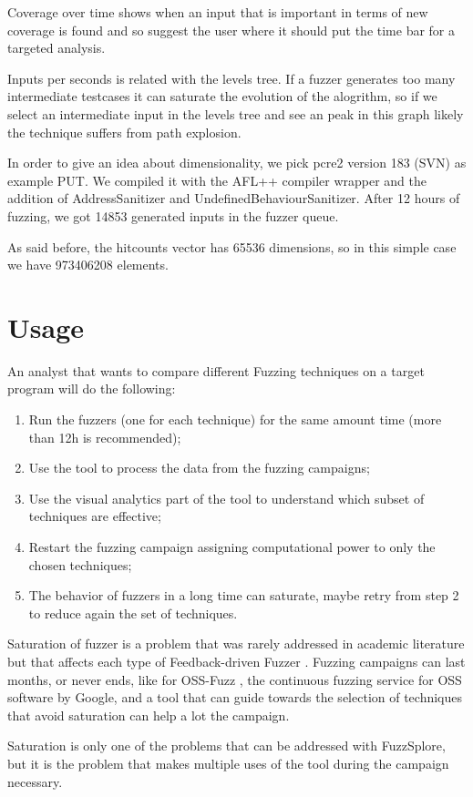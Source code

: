 \documentclass[conference,compsoc]{IEEEtran}
\begin{document}
Coverage over time shows when an input that is important in terms of new coverage is found and so suggest the user where it should put the time bar for a targeted analysis.

Inputs per seconds is related with the levels tree. If a fuzzer generates too many intermediate testcases it can saturate the evolution of the alogrithm, so if we select an intermediate input in the levels tree and see an peak in this graph likely the technique suffers from path explosion.

In order to give an idea about dimensionality, we pick pcre2 version 183 (SVN) as example PUT. We compiled it with the AFL++ compiler wrapper and the addition of AddressSanitizer and UndefinedBehaviourSanitizer. After 12 hours of fuzzing, we got 14853 generated inputs in the fuzzer queue.

As said before, the hitcounts vector has 65536 dimensions, so in this simple case we have 973406208 elements.

\section{Usage}

An analyst that wants to compare different Fuzzing techniques on a target program will do the following:

\begin{enumerate}
\item Run the fuzzers (one for each technique) for the same amount time (more than 12h is recommended);
\item Use the tool to process the data from the fuzzing campaigns;
\item Use the visual analytics part of the tool to understand which subset of techniques are effective;
\item Restart the fuzzing campaign assigning computational power to only the chosen techniques;
\item The behavior of fuzzers in a long time can saturate, maybe retry from step 2 to reduce again the set of techniques.
\end{enumerate}

Saturation of fuzzer is a problem that was rarely addressed in academic literature but that affects each type of Feedback-driven Fuzzer \cite{saturation}.
Fuzzing campaigns can last months, or never ends, like for OSS-Fuzz \cite{serebryany2017oss}, the continuous fuzzing service for OSS software by Google, and a tool that can guide towards the selection of techniques that avoid saturation can help a lot the campaign.

Saturation is only one of the problems that can be addressed with {\sc FuzzSplore}, but it is the problem that makes multiple uses of the tool during the campaign necessary.
\fi



\end{document}
